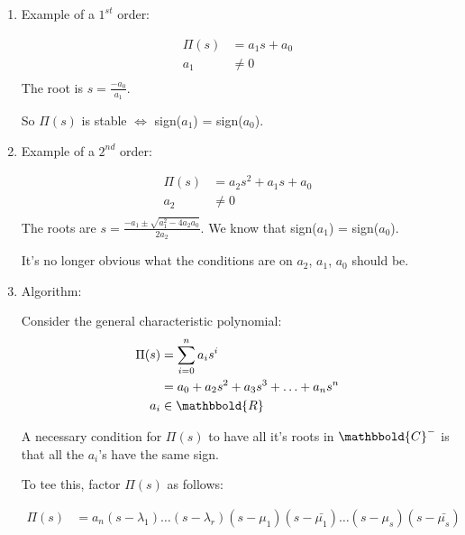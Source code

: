 \begin{enumerate}
\begin{enumerate}
                \item Example of a $1^{st}$ order:

                        \begin{align*}
                            \Pi(s) &= a_1 s + a_0 \\
                            a_1 &\ne 0 \\
                        \end{align*}
                        The root is $s = \frac{-a_0}{a_1}$.

                        So $\Pi(s)$ is stable $\Leftrightarrow$ sign($a_1$) = sign($a_0$).

                \item Example of a $2^{nd}$ order:

                        \begin{align*}
                            \Pi(s) &= a_2 s^2 + a_1 s + a_0 \\
                            a_2 &\ne 0 \\
                        \end{align*}
                        The roots are $s = \frac{-a_1 \pm \sqrt{a_1^2 - 4 a_2 a_0}}{2 a_2}$.
                        We know that sign($a_1$) = sign($a_0$).

                        It's no longer obvious what the conditions are on $a_2$, $a_1$, $a_0$ should be.

                \item Algorithm:

                    Consider the general characteristic polynomial:
                    \begin{align*}
                        \Pi(s) &= \sum_{i=0}^{n} a_i s^i \\
                        &= a_0 + a_2 s^2 + a_3 s^3 + \ldots + a_n s^n \\
                        a_i &\in \mathbbold{R}
                    \end{align*}

                    A necessary condition for $\Pi(s)$ to have all it's roots in $\mathbbold{C}^-$ is that all the $a_i$'s have the same sign.

                    To tee this, factor $\Pi(s)$ as follows:

                    \begin{align*}
                        \Pi(s) &= a_n (s-\lambda_1) \ldots (s-\lambda_r)(s-\mu_1)(s-\bar{\mu_1}) \ldots (s-\mu_s)(s-\bar{\mu_s})
                    \end{align*}


\end{enumerate}
\end{enumerate}
